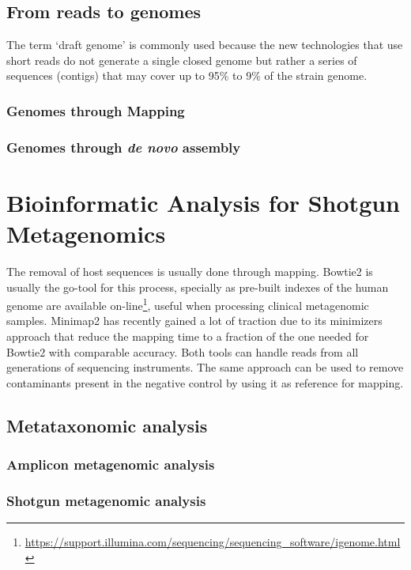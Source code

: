 \subsection{From reads to genomes}

The term ‘draft genome’ is commonly used because the new technologies that use short reads do not generate a single closed genome but rather a series of sequences (contigs) that may cover up to 95\% to 9\% of the strain genome.

\subsubsection{Genomes through Mapping}

\subsubsection{Genomes through \textit{de novo} assembly}

\section{Bioinformatic Analysis for Shotgun Metagenomics}

The removal of host sequences is usually done through mapping. Bowtie2 \citep{langmead_fast_2012} is usually the go-tool for this process, specially as pre-built indexes of the human genome are available on-line\footnote{\url{https://support.illumina.com/sequencing/sequencing\_software/igenome.html}}, useful when processing clinical metagenomic samples. Minimap2 \citep{li_minimap2_2018} has recently gained a lot of traction due to its minimizers approach that reduce the mapping time to a fraction of the one needed for Bowtie2 with comparable accuracy. Both tools can handle reads from all generations of sequencing instruments. The same approach can be used to remove contaminants present in the negative control by using it as reference for mapping. 

\subsection{Metataxonomic analysis}

\subsubsection{Amplicon metagenomic analysis}

\subsubsection{Shotgun metagenomic analysis}


